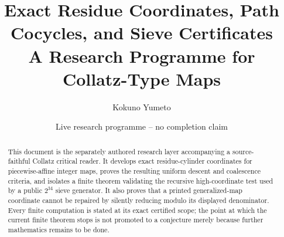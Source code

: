 \documentclass[11pt,letterpaper]{article}
\title{Exact Residue Coordinates, Path Cocycles, and Sieve Certificates\\
\large A Research Programme for Collatz-Type Maps}
\author{Kokuno Yumeto}
\date{Live research programme -- no completion claim}
\theoremstyle{definition}
\theoremstyle{remark}
\begin{document}
\maketitle

\begin{abstract}
This document is the separately authored research layer accompanying a
source-faithful Collatz critical reader.  It develops exact residue-cylinder
coordinates for piecewise-affine integer maps, proves the resulting uniform
descent and coalescence criteria, and isolates a finite theorem validating the
recursive high-coordinate test used by a public $2^{34}$ sieve generator.
It also proves that a printed generalized-map coordinate cannot be repaired by
silently reducing modulo its displayed denominator. Every finite computation
is stated at its exact certified scope; the point at which the current finite
theorem stops is not promoted to a conjecture merely because further
mathematics remains to be done.
\end{abstract}

\tableofcontents








\end{document}
